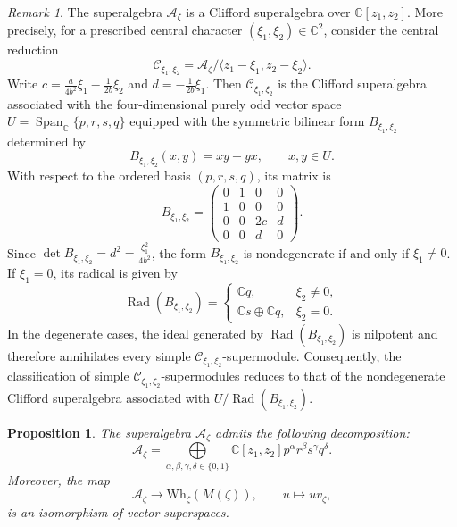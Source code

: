 \documentclass[a4paper,10pt]{article}
\theoremstyle{definition}
\theoremstyle{plain}
\newtheorem{proposition}[definition]{Proposition}
\theoremstyle{remark}
\newtheorem{remark}[definition]{Remark}
\theoremstyle{mystyle}
\numberwithin{equation}{section}
\begin{document}
\begin{remark}
    The superalgebra $\mathcal A_{\zeta}$ is a Clifford superalgebra over $\mathbb C[z_1,z_2]$. More precisely, for a prescribed central character $(\xi_1,\xi_2)\in \mathbb C^2$, consider the central reduction 
    $$
    \mathcal C_{\xi_1,\xi_2}=\mathcal A_{\zeta}/\langle z_1-\xi_1,z_2-\xi_2\rangle.
    $$
    Write $c=\frac{a}{4b^2}\xi_1-\frac{1}{2b}\xi_2$ and $d=-\frac{1}{2b}\xi_1$. Then \(\mathcal C_{\xi_1,\xi_2}\) is the Clifford superalgebra associated with the four-dimensional purely odd vector space $U=\operatorname{Span}_{\mathbb C}\{p,r,s,q\}$ equipped with the symmetric bilinear form \(B_{\xi_1,\xi_2}\) determined by
    \[
    B_{\xi_1,\xi_2}(x,y)=xy+yx,\qquad x,y\in U.
    \]
    With respect to the ordered basis \((p,r,s,q)\), its matrix is
    \[
    B_{\xi_1,\xi_2}=
    \begin{pmatrix}
    0&1&0&0\\
    1&0&0&0\\
    0&0&2c&d\\
    0&0&d&0
    \end{pmatrix}.
    \]
    Since $\det B_{\xi_1,\xi_2}=d^2=\frac{\xi_1^2}{4b^2}$, the form \(B_{\xi_1,\xi_2}\) is nondegenerate if and only if \(\xi_1\neq0\). If \(\xi_1=0\), its radical is given by
    \[
    \operatorname{Rad}(B_{\xi_1,\xi_2})=
    \begin{cases}
        \mathbb Cq,&\xi_2\neq0,\\
        \mathbb Cs\oplus\mathbb Cq,&\xi_2=0.
    \end{cases}
    \]
    In the degenerate cases, the ideal generated by \(\operatorname{Rad}(B_{\xi_1,\xi_2})\) is nilpotent and therefore annihilates every simple \(\mathcal C_{\xi_1,\xi_2}\)-supermodule. Consequently, the classification of simple \(\mathcal C_{\xi_1,\xi_2}\)-supermodules reduces to that of the nondegenerate Clifford superalgebra associated with \(U/\operatorname{Rad}(B_{\xi_1,\xi_2})\).
\end{remark}
\begin{proposition}\label{Aphi}
    The superalgebra $\mathcal A_{\zeta}$ admits the following decomposition:
    $$
    \mathcal A_{\zeta}=\bigoplus\limits_{\alpha ,\beta ,\gamma,\delta\in \{0,1\}}\mathbb C[z_1,z_2]p^{\alpha}r^{\beta}s^{\gamma}q^{\delta}.
    $$ 
    Moreover, the map
    \[
        \mathcal A_\zeta\to \mathrm{Wh}_{\zeta}(M(\zeta)),
        \qquad u\mapsto uv_{\zeta},
    \]
    is an isomorphism of vector superspaces.
\end{proposition}
\end{document}
